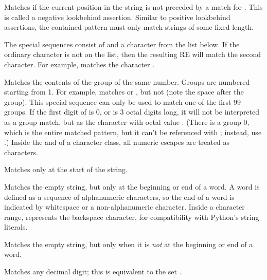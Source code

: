 \begin{list}{}{\leftmargin 0.7in }
\item[\code{(?<!...)}] Matches if the current position in the string
is not preceded by a match for .  This
is called a negative lookbehind assertion.  Similar to positive lookbehind
assertions, the contained pattern must only match strings of some
fixed length.

\end{list}

The special sequences consist of \character{\e} and a character from the
list below.  If the ordinary character is not on the list, then the
resulting RE will match the second character.  For example,
\regexp{\e\$} matches the character \character{\$}.

\begin{list}{}{\leftmargin 0.7in }

\item[\code{\e \var{number}}] Matches the contents of the group of the
same number.  Groups are numbered starting from 1.  For example,
 matches  or , but not
 (note
the space after the group).  This special sequence can only be used to
match one of the first 99 groups.  If the first digit of 
is 0, or  is 3 octal digits long, it will not be interpreted
as a group match, but as the character with octal value .
(There is a group 0, which is the entire matched pattern, but it can't
be referenced with ; instead, use .)
Inside the \character{[} and \character{]} of a character class, all numeric
escapes are treated as characters.

\item[\code{\e A}] Matches only at the start of the string.

\item[\code{\e b}] Matches the empty string, but only at the
beginning or end of a word.  A word is defined as a sequence of
alphanumeric characters, so the end of a word is indicated by
whitespace or a non-alphanumeric character.  Inside a character range,
 represents the backspace character, for compatibility with
Python's string literals.

\item[\code{\e B}] Matches the empty string, but only when it is
\emph{not} at the beginning or end of a word.

\item[\code{\e d}]Matches any decimal digit; this is
equivalent to the set \regexp{[0-9]}.


\end{list}
